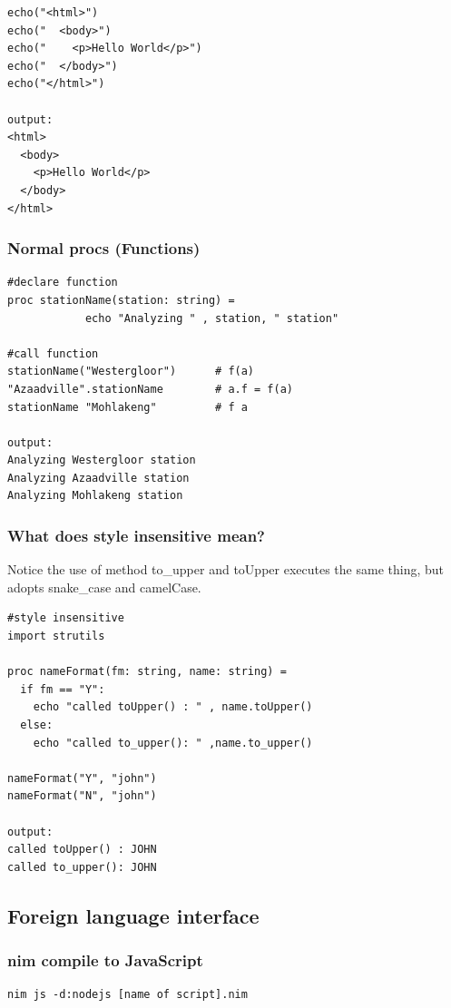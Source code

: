 \documentclass[10pt, a4paper, twocolumn]{article} %
\begin{document}
\begin{lstlisting}
echo("<html>")
echo("  <body>")
echo("    <p>Hello World</p>")
echo("  </body>")
echo("</html>")

output:
<html>
  <body>
    <p>Hello World</p>
  </body>
</html>
\end{lstlisting}


\subsubsection{Normal procs (Functions)}

\begin{lstlisting}
#declare function
proc stationName(station: string) =
			echo "Analyzing " , station, " station"

#call function
stationName("Westergloor")      # f(a)
"Azaadville".stationName        # a.f = f(a)
stationName "Mohlakeng"         # f a

output:
Analyzing Westergloor station
Analyzing Azaadville station
Analyzing Mohlakeng station
\end{lstlisting}

\subsubsection{What does style insensitive mean?}

Notice the use of method to\_upper\(\) and toUpper\(\) executes
the same thing, but adopts snake\_case and camelCase.

\begin{lstlisting}
#style insensitive
import strutils

proc nameFormat(fm: string, name: string) =
  if fm == "Y":
    echo "called toUpper() : " , name.toUpper()
  else:
    echo "called to_upper(): " ,name.to_upper()

nameFormat("Y", "john")
nameFormat("N", "john")

output:
called toUpper() : JOHN
called to_upper(): JOHN
\end{lstlisting}

\subsection{Foreign language interface}

\subsubsection{nim compile to JavaScript}
\begin{lstlisting}
nim js -d:nodejs [name of script].nim
\end{lstlisting}
\end{document}
